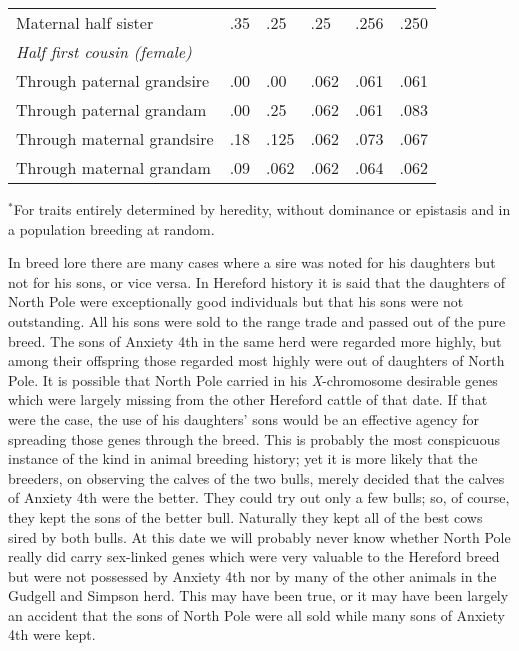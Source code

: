 \begin{table}[htbp]
\begin{center}
\begin{tabular}{L{5.24cm}|C{1.25cm}|C{1.25cm}|C{1.25cm}|C{1.25cm}|C{1.25cm}}
		\hspace{1em}Maternal half sister			& .35	& .25	& .25	& .256	& .250	\\
		\textit{Half first cousin (female)}	& ~		& ~		& ~		& ~		& ~	\\
		\hspace{1em}Through paternal grandsire		& .00	& .00	& .062	& .061	& .061	\\
		\hspace{1em}Through paternal grandam		& .00	& .25	& .062	& .061	& .083	\\
		\hspace{1em}Through maternal grandsire		& .18	& .125	& .062	& .073	& .067	\\
		\hspace{1em}Through maternal grandam		& .09	& .062	& .062	& .064	& .062	\\
		\hline
	\end{tabular}
	\end{center}
	$^*$For traits entirely determined by heredity, without dominance or epistasis and in a population breeding at random.
\end{table}

In breed lore there are many cases where a sire was noted for his
daughters but not for his sons, or vice versa. In Hereford history it is
said that the daughters of North Pole were exceptionally good individuals
but that his sons were not outstanding. All his sons were sold to
the range trade and passed out of the pure breed. The sons of Anxiety
4th in the same herd were regarded more highly, but among their offspring
those regarded most highly were out of daughters of North Pole.
It is possible that North Pole carried in his \textit{X}-chromosome desirable
genes which were largely missing from the other Hereford cattle of that
date. If that were the case, the use of his daughters' sons would be an
effective agency for spreading those genes through the breed. This is
probably the most conspicuous instance of the kind in animal breeding
history; yet it is more likely that the breeders, on observing the calves
of the two bulls, merely decided that the calves of Anxiety 4th were the
better. They could try out only a few bulls; so, of course, they kept the
sons of the better bull. Naturally they kept all of the best cows sired by
both bulls. At this date we will probably never know whether North
Pole really did carry sex-linked genes which were very valuable to the
Hereford breed but were not possessed by Anxiety 4th nor by many of
the other animals in the Gudgell and Simpson herd. This may have
been true, or it may have been largely an accident that the sons of
North Pole were all sold while many sons of Anxiety 4th were kept.

